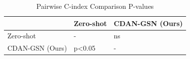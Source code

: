 \begin{table}
\caption{Pairwise C-index Comparison P-values}
\label{tab:pvalues}
\begin{tabular}{lll}
\toprule
 & Zero-shot & CDAN-GSN (Ours) \\
\midrule
Zero-shot & - & ns \\
CDAN-GSN (Ours) & p<0.05 & - \\
\bottomrule
\end{tabular}
\end{table}
